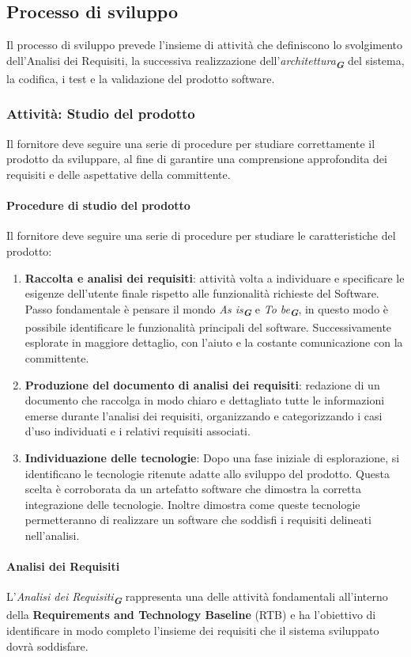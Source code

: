 \documentclass[a4paper,12pt]{article}
\newcommand{\glossario}[1]{\textit{#1}\textsubscript{\textbf{\textit{\textcolor{lightblack}{G}}}}}
\begin{document}
\subsection{Processo di sviluppo}
Il processo di sviluppo prevede l'insieme di attività che definiscono lo svolgimento dell'Analisi dei Requisiti, la successiva realizzazione dell'\glossario{architettura} del sistema, la codifica, i test e la validazione del prodotto software.
\subsubsection{Attività: Studio del prodotto}
Il fornitore deve seguire una serie di procedure per studiare correttamente il prodotto da sviluppare, al fine di garantire una comprensione approfondita dei requisiti e delle aspettative della committente.
\paragraph{Procedure di studio del prodotto}
Il fornitore deve seguire una serie di procedure per studiare le caratteristiche del prodotto:
\begin{enumerate}
    \item \textbf{Raccolta e analisi dei requisiti}: attività volta a individuare e specificare le esigenze dell'utente finale rispetto alle funzionalità richieste del Software. Passo fondamentale è pensare il mondo \glossario{As is} e \glossario{To be}, in questo modo è possibile identificare le funzionalità principali del software. Successivamente esplorate in maggiore dettaglio, con l'aiuto e la costante comunicazione con la committente.
    \item \textbf{Produzione del documento di analisi dei requisiti}: redazione di un documento che raccolga in modo chiaro e dettagliato tutte le informazioni emerse durante l'analisi dei requisiti, organizzando e categorizzando i casi d'uso individuati e i relativi requisiti associati.
    \item \textbf{Individuazione delle tecnologie}: Dopo una fase iniziale di esplorazione, si identificano le tecnologie ritenute adatte allo sviluppo del prodotto. Questa scelta è corroborata da un artefatto software che dimostra la corretta integrazione delle tecnologie. Inoltre dimostra come queste tecnologie permetteranno di realizzare un software che soddisfi i requisiti delineati nell'analisi.
\end{enumerate}
\paragraph{Analisi dei Requisiti}
L'\glossario{Analisi dei Requisiti} rappresenta una delle attività fondamentali all'interno della \textbf{Requirements and Technology Baseline} (RTB) e ha l'obiettivo di identificare in modo completo l'insieme dei requisiti che il sistema sviluppato dovrà soddisfare.
\end{document}
